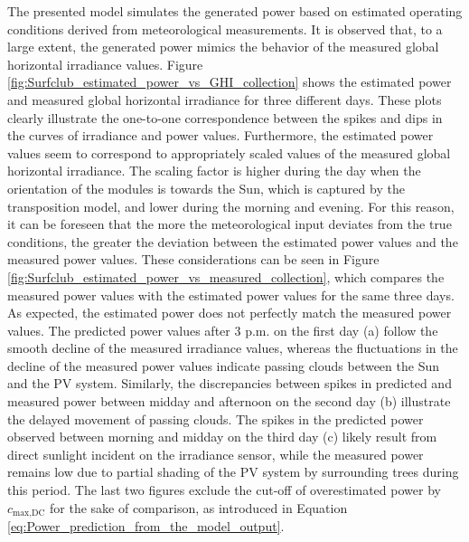 The presented model simulates the generated power
based on estimated operating conditions derived from meteorological measurements.
It is observed that, to a large extent, the generated power
mimics the behavior of the measured global horizontal irradiance values.
Figure \ref{fig:Surfclub_estimated_power_vs_GHI_collection} shows the estimated
power and measured global horizontal irradiance for three
different days. These plots clearly illustrate the one-to-one correspondence
between the spikes and dips in the curves of irradiance and power values.
Furthermore, the estimated power values seem to correspond to appropriately
scaled values of the measured global horizontal irradiance. The scaling
factor is higher during the day when the orientation of the modules is
towards the Sun, which is captured by the transposition model, and lower
during the morning and evening. For this reason, it can be foreseen that
the more the meteorological input deviates from the true conditions, the
greater the deviation between the estimated power values and the measured
power values. These considerations can be seen in Figure
\ref{fig:Surfclub_estimated_power_vs_measured_collection}, which compares
the measured power values with the estimated power values for the same
three days. As expected, the estimated power does not perfectly match
the measured power values. The predicted power values after 3 p.m. on
the first day (a) follow the smooth decline of the measured irradiance
values, whereas the fluctuations in the decline of the measured power
values indicate passing clouds between the Sun and the PV system.
Similarly, the discrepancies between spikes in predicted and measured
power between midday and afternoon on the second day (b) illustrate
the delayed movement of passing clouds. The spikes in the predicted power
observed between morning and midday on the third day (c) likely result
from direct sunlight incident on the irradiance sensor, while the measured
power remains low due to partial shading of the PV system by surrounding
trees during this period. The last two figures exclude the cut-off of
overestimated power by \(c_{\text{max,DC}}\) for the sake of comparison,
as introduced in Equation \ref{eq:Power_prediction_from_the_model_output}.


